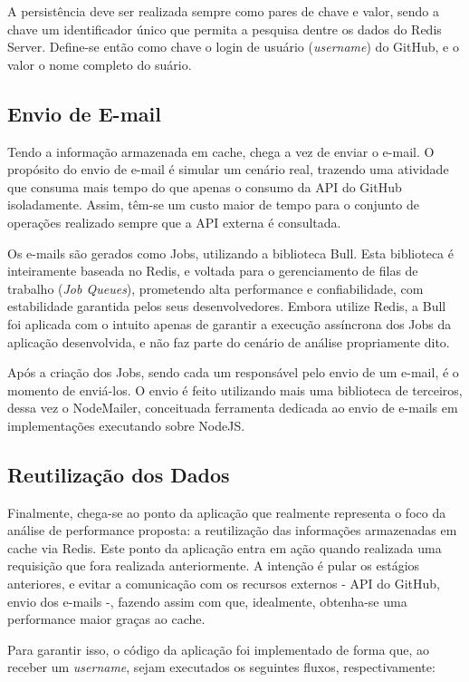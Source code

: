 \documentclass[12pt]{article}
\begin{document}
A persistência deve ser realizada sempre como pares de chave e valor, sendo a chave um identificador único que permita a pesquisa dentre os dados do Redis Server. Define-se então como chave o login de usuário (\textit{username}) do GitHub, e o valor o nome completo do suário.

\subsection{Envio de E-mail}

Tendo a informação armazenada em cache, chega a vez de enviar o e-mail. O propósito do envio de e-mail é simular um cenário real, trazendo uma atividade que consuma mais tempo do que apenas o consumo da API do GitHub isoladamente. Assim, têm-se um custo maior de tempo para o conjunto de operações realizado sempre que a API externa é consultada.

Os e-mails são gerados como Jobs, utilizando a biblioteca Bull. Esta biblioteca é inteiramente baseada no Redis, e voltada para o gerenciamento de filas de trabalho (\textit{Job Queues}), prometendo alta performance e confiabilidade, com estabilidade garantida pelos seus desenvolvedores. Embora utilize Redis, a Bull foi aplicada com o intuito apenas de garantir a execução assíncrona dos Jobs da aplicação desenvolvida, e não faz parte do cenário de análise propriamente dito.

Após a criação dos Jobs, sendo cada um responsável pelo envio de um e-mail, é o momento de enviá-los. O envio é feito utilizando mais uma biblioteca de terceiros, dessa vez o NodeMailer, conceituada ferramenta dedicada ao envio de e-mails em implementações executando sobre NodeJS.

\subsection{Reutilização dos Dados}

Finalmente, chega-se ao ponto da aplicação que realmente representa o foco da análise de performance proposta: a reutilização das informações armazenadas em cache via Redis. Este ponto da aplicação entra em ação quando realizada uma requisição que fora realizada anteriormente. A intenção é pular os estágios anteriores, e evitar a comunicação com os recursos externos - API do GitHub, envio dos e-mails -, fazendo assim com que, idealmente, obtenha-se uma performance maior graças ao cache.

Para garantir isso, o código da aplicação foi implementado de forma que, ao receber um \textit{username}, sejam executados os seguintes fluxos, respectivamente:
\end{document}
